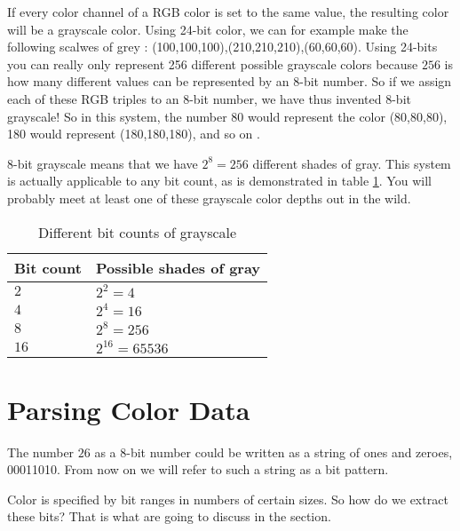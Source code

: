 \newcommand{\selfrgbtrip}[3]{\mbox{\textcolor[RGB]{#1,#2,#3}{(#1,#2,#3)}}}
\newcommand{\selfrgbtripgray}[1]{\selfrgbtrip{#1}{#1}{#1}}

If every color channel of a RGB color is set to the same value, the
resulting color will be a grayscale color. Using 24-bit color, we can for example make the following
scalwes of grey :
\selfrgbtripgray{100},\selfrgbtripgray{210},\selfrgbtripgray{60}. Using
24-bits you can really only represent 256 different possible
grayscale colors because $256$ is how many different values can be
represented by an 8-bit number. So if we assign each of these RGB
triples to an 8-bit number, we have thus invented 8-bit
grayscale! So in this system, the number 80
would represent the color \selfrgbtripgray{80}, 180 would represent
\selfrgbtripgray{180}, and so on \cite{puglia00:_handbook_dig_proj}.

8-bit grayscale means that we have $2^8=256$ different shades of
gray. This system is actually applicable to any bit count, as is
demonstrated in table \ref{tab:grayscale}. You will probably meet at least one of
these grayscale color depths out in the wild.

\begin{table}
  \centering
  \begin{tabular}{ll}
    \toprule
    Bit count & Possible shades of gray \\
    \midrule
    $2$ & $2^2 = 4$ \\
    $4$ & $2^4 = 16$ \\
    $8$ & $2^8 = 256$ \\
    $16$ & $2^{16} = 65536$ \\
    \bottomrule
  \end{tabular}
  \caption{Different bit counts of grayscale}
  \label{tab:grayscale}
\end{table}

\section{Parsing Color Data}
\label{sec:parsing-color-data}

The number $26$ as a 8-bit number could be written as a string of
ones and zeroes, 00011010. From now on we will refer to such a
string as a bit pattern.

Color is specified by bit ranges in numbers of certain
sizes. So how do we extract these bits? That is what are going to
discuss in the section.

